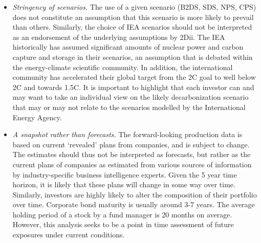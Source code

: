 \documentclass[10pt,table,a4]{article}\usepackage[]{graphicx}\usepackage[]{color}
\begin{document}
	\begin{multicols}{2}
		\begin{itemize}
			\item{\textit{Stringency of scenarios.} The use of a given scenario (B2DS, SDS, NPS, CPS) does not constitute an assumption that this scenario is more likely to prevail than others. Similarly, the choice of IEA scenarios should not be interpreted as an endorsement of the underlying assumptions by 2Dii. The IEA historically has assumed significant amounts of nuclear power and carbon capture and storage in their scenarios, an assumption that is debated within the energy-climate scientific community. In addition, the international community has accelerated their global target from the 2\degree C goal to well below 2\degree C and towards 1.5\degree C. It is important to highlight that each investor can and may want to take an individual view on the likely decarbonization scenario that may or may not relate to the scenarios modelled by the International Energy Agency.}
			
			\item{\textit{A snapshot rather than forecasts.} The forward-looking production data is based on current `revealed' plans from companies, and is subject to change. The estimates should thus not be interpreted as forecasts, but rather as the current plans of companies as estimated from various sources of information by industry-specific business intelligence experts. Given the 5 year time horizon, it is likely that these plans will change in some way over time. Similarly, investors are highly likely to alter the composition of their portfolio over time. Corporate bond maturity is usually around 3-7 years. The average holding period of a stock by a fund manager is 20 months on average. However, this analysis seeks to be a point in time assessment of future exposures under current conditions.}
			

\end{itemize}
\end{multicols}
\end{document}
